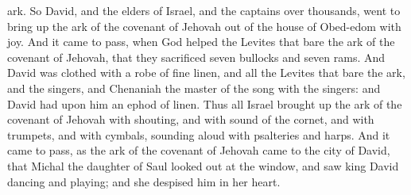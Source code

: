 ark.  So David, and the elders of Israel, and the captains over thousands, went to bring up the ark of the covenant of Jehovah out of the house of Obed-edom with joy. And it came to pass, when God helped the Levites that bare the ark of the covenant of Jehovah, that they sacrificed seven bullocks and seven rams. And David was clothed with a robe of fine linen, and all the Levites that bare the ark, and the singers, and Chenaniah the master of the song with the singers: and David had upon him an ephod of linen. Thus all Israel brought up the ark of the covenant of Jehovah with shouting, and with sound of the cornet, and with trumpets, and with cymbals, sounding aloud with psalteries and harps.  And it came to pass, as the ark of the covenant of Jehovah came to the city of David, that Michal the daughter of Saul looked out at the window, and saw king David dancing and playing; and she despised him in her heart. 

